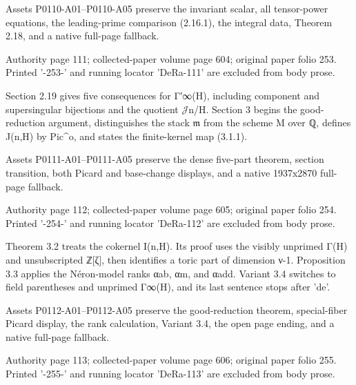 \documentclass[11pt,a4paper]{article}
\begin{document}
Assets P0110-A01--P0110-A05 preserve the invariant scalar, all tensor-power equations, the leading-prime comparison (2.16.1), the integral data, Theorem 2.18, and a native full-page fallback.


\par\medskip
\hypertarget{D018-P0111}{}
\par\smallskip
Authority page 111; collected-paper volume page 604; original paper folio 253. Printed '-253-' and running locator 'DeRa-111' are excluded from body prose.

Section 2.19 gives five consequences for Γ′\textunderscore{}∞(H), including component and supersingular bijections and the quotient \ensuremath{\mathcal{J}}\textunderscore{}n/H. Section 3 begins the good-reduction argument, distinguishes the stack \ensuremath{\mathfrak{m}} from the scheme M over ℚ, defines J(n,H) by Pic\textasciicircum{}o, and states the finite-kernel map (3.1.1).

Assets P0111-A01--P0111-A05 preserve the dense five-part theorem, section transition, both Picard and base-change displays, and a native 1937x2870 full-page fallback.


\par\medskip
\hypertarget{D018-P0112}{}
\par\smallskip
Authority page 112; collected-paper volume page 605; original paper folio 254. Printed '-254-' and running locator 'DeRa-112' are excluded from body prose.

Theorem 3.2 treats the cokernel I(n,H). Its proof uses the visibly unprimed Γ(H) and unsubscripted ℤ[ζ], then identifies a toric part of dimension ν-1. Proposition 3.3 applies the Néron-model ranks α\textunderscore{}ab, α\textunderscore{}m, and α\textunderscore{}add. Variant 3.4 switches to field parentheses and unprimed Γ\textunderscore{}∞(H), and its last sentence stops after 'de'.

Assets P0112-A01--P0112-A05 preserve the good-reduction theorem, special-fiber Picard display, the rank calculation, Variant 3.4, the open page ending, and a native full-page fallback.


\par\medskip
\hypertarget{D018-P0113}{}
\par\smallskip
Authority page 113; collected-paper volume page 606; original paper folio 255. Printed '-255-' and running locator 'DeRa-113' are excluded from body prose.
\end{document}
